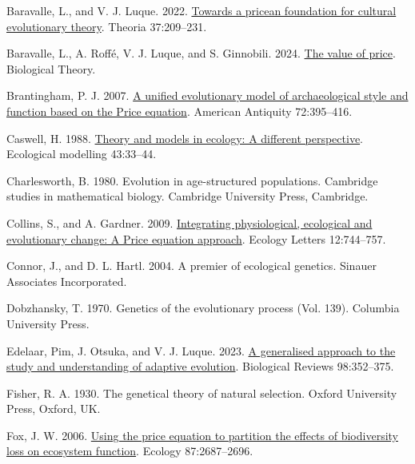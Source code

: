 \documentclass[
]{article}
\newlength{\cslhangindent}
\newenvironment{CSLReferences}[2] %
 {\begin{list}{}{%
  \setlength{\itemindent}{0pt}
  \setlength{\leftmargin}{0pt}
  \setlength{\parsep}{0pt}
  \ifodd #1
   \setlength{\leftmargin}{\cslhangindent}
   \setlength{\itemindent}{-1\cslhangindent}
  \fi
  \setlength{\itemsep}{#2\baselineskip}}}
 {\end{list}}
\begin{document}
\label{refs}
\begin{CSLReferences}{0}{0}
Baravalle, L., and V. J. Luque. 2022.
\href{https://doi.org/10.1387/theoria.21940}{Towards a pricean
foundation for cultural evolutionary theory}. Theoria 37:209--231.

Baravalle, L., A. Roffé, V. J. Luque, and S. Ginnobili. 2024.
\href{https://doi.org/10.1007/s13752-024-00482-4}{The value of price}.
Biological Theory.

Brantingham, P. J. 2007. \href{https://doi.org/10.2307/40035853}{{A
unified evolutionary model of archaeological style and function based on
the Price equation}}. American Antiquity 72:395--416.

Caswell, H. 1988.
\href{https://doi.org/10.1016/0304-3800(88)90071-3}{Theory and models in
ecology: A different perspective}. Ecological modelling 43:33--44.

Charlesworth, B. 1980. Evolution in age-structured populations.
Cambridge studies in mathematical biology. Cambridge University Press,
Cambridge.

Collins, S., and A. Gardner. 2009.
\href{https://doi.org/10.1111/j.1461-0248.2009.01340.x}{{Integrating
physiological, ecological and evolutionary change: A Price equation
approach}}. Ecology Letters 12:744--757.

Connor, J., and D. L. Hartl. 2004. {A premier of ecological genetics}.
Sinauer Associates Incorporated.

Dobzhansky, T. 1970. Genetics of the evolutionary process (Vol. 139).
Columbia University Press.

Edelaar, Pim, J. Otsuka, and V. J. Luque. 2023.
\href{https://doi.org/10.1111/brv.12910}{{A generalised approach to the
study and understanding of adaptive evolution}}. Biological Reviews
98:352--375.

Fisher, R. A. 1930. The genetical theory of natural selection. Oxford
University Press, Oxford, UK.

Fox, J. W. 2006.
\href{https://doi.org/10.1890/0012-9658(2006)87\%5B2687:utpetp\%5D2.0.co;2}{{Using
the price equation to partition the effects of biodiversity loss on
ecosystem function}}. Ecology 87:2687--2696.


\end{CSLReferences}
\end{document}
